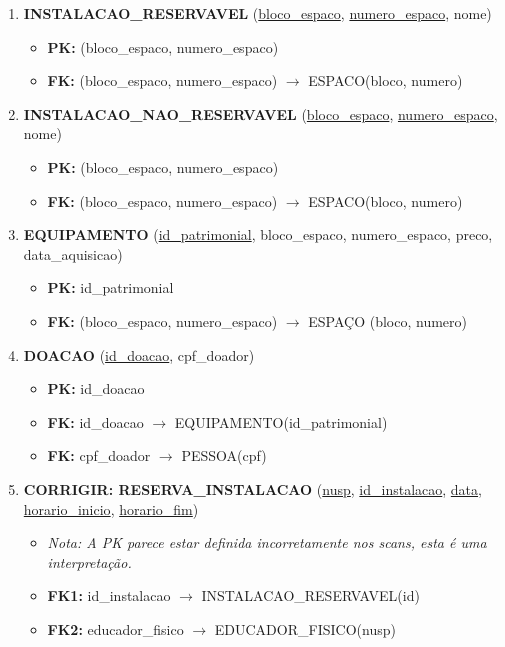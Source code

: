 \documentclass{article}
\begin{document}
\begin{enumerate}
    \item \textbf{INSTALACAO\_RESERVAVEL} (\underline{bloco\_espaco}, \underline{numero\_espaco}, nome)
        \begin{itemize}
            \item \textbf{PK:} (bloco\_espaco, numero\_espaco)
            \item \textbf{FK:} (bloco\_espaco, numero\_espaco) $\rightarrow$ ESPACO(bloco, numero)
        \end{itemize}

    \item \textbf{INSTALACAO\_NAO\_RESERVAVEL} (\underline{bloco\_espaco}, \underline{numero\_espaco}, nome)
        \begin{itemize}
            \item \textbf{PK:} (bloco\_espaco, numero\_espaco)
            \item \textbf{FK:} (bloco\_espaco, numero\_espaco) $\rightarrow$ ESPACO(bloco, numero)
        \end{itemize}

    \item \textbf{EQUIPAMENTO} (\underline{id\_patrimonial}, bloco\_espaco, numero\_espaco, preco, data\_aquisicao)
        \begin{itemize}
            \item \textbf{PK:} id\_patrimonial
            \item \textbf{FK:} (bloco\_espaco, numero\_espaco) $\rightarrow$ ESPAÇO (bloco, numero)
        \end{itemize}
        
    \item \textbf{DOACAO} (\underline{id\_doacao}, cpf\_doador)
        \begin{itemize}
            \item \textbf{PK:} id\_doacao
            \item \textbf{FK:} id\_doacao $\rightarrow$ EQUIPAMENTO(id\_patrimonial)
            \item \textbf{FK:} cpf\_doador $\rightarrow$ PESSOA(cpf)
        \end{itemize}

    \item \textbf{CORRIGIR: RESERVA\_INSTALACAO} (\underline{nusp}, \underline{id\_instalacao}, \underline{data}, \underline{horario\_inicio}, \underline{horario\_fim})
         \begin{itemize}
            \item \textit{Nota: A PK parece estar definida incorretamente nos scans, esta é uma interpretação.}
            \item \textbf{FK1:} id\_instalacao $\rightarrow$ INSTALACAO\_RESERVAVEL(id)
            \item \textbf{FK2:} educador\_fisico $\rightarrow$ EDUCADOR\_FISICO(nusp)
        \end{itemize}
        

\end{enumerate}
\end{document}

